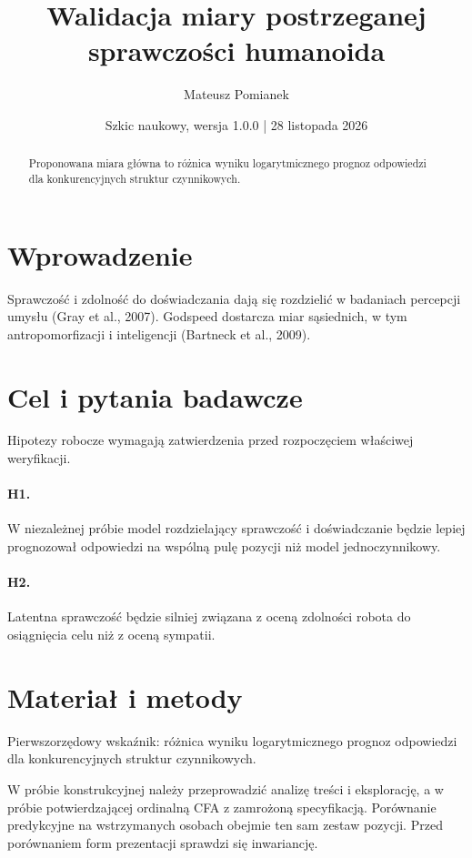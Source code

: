 \documentclass[11pt,a4paper]{article}
\title{Walidacja miary postrzeganej sprawczości humanoida}
\author{Mateusz Pomianek}
\date{Szkic naukowy, wersja 1.0.0 | 28 listopada 2026}
\begin{document}
\maketitle

\begin{abstract}

Proponowana miara główna to różnica wyniku logarytmicznego prognoz odpowiedzi dla konkurencyjnych struktur czynnikowych.

\end{abstract}

\section{Wprowadzenie}

Sprawczość i zdolność do doświadczania dają się rozdzielić w badaniach percepcji umysłu (Gray et al., 2007). Godspeed dostarcza miar sąsiednich, w tym antropomorfizacji i inteligencji (Bartneck et al., 2009).

\section{Cel i pytania badawcze}

Hipotezy robocze wymagają zatwierdzenia przed rozpoczęciem właściwej weryfikacji.

\paragraph{H1.} W niezależnej próbie model rozdzielający sprawczość i doświadczanie będzie lepiej prognozował odpowiedzi na wspólną pulę pozycji niż model jednoczynnikowy.

\paragraph{H2.} Latentna sprawczość będzie silniej związana z oceną zdolności robota do osiągnięcia celu niż z oceną sympatii.

\section{Materiał i metody}

Pierwszorzędowy wskaźnik: różnica wyniku logarytmicznego prognoz odpowiedzi dla konkurencyjnych struktur czynnikowych.

W próbie konstrukcyjnej należy przeprowadzić analizę treści i eksplorację, a w próbie potwierdzającej ordinalną CFA z zamrożoną specyfikacją. Porównanie predykcyjne na wstrzymanych osobach obejmie ten sam zestaw pozycji. Przed porównaniem form prezentacji sprawdzi się inwariancję.
\end{document}
